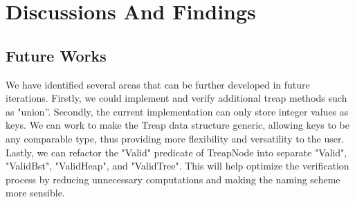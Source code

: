 \newpage
\section{Discussions And Findings}
\setcounter{subsection}{0}

\subsection{Future Works}
We have identified several areas that can be further developed in future iterations. Firstly, we could implement and verify additional treap methods such as "union”. Secondly, the current implementation can only store integer values as keys. We can work to make the Treap data structure generic, allowing keys to be any comparable type, thus providing more flexibility and versatility to the user. Lastly, we can refactor the "Valid" predicate of TreapNode into separate "Valid", "ValidBst", "ValidHeap", and "ValidTree". This will help optimize the verification process by reducing unnecessary computations and making the naming scheme more sensible.\\

